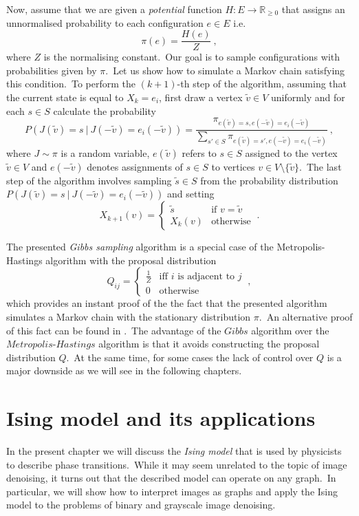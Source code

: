 \documentclass[shortabstract, english, lic]{iithesis}
\newcommand\numberedchapter[1]{\setlength\topskip{3cm}\chapter{#1}\setlength\topskip{0cm}}
\theoremstyle{default_theorem_style}\newtheorem{theorem}{Theorem}
\theoremstyle{default_theorem_style}\newtheorem{definition}{Definition}
\begin{document}
\noindent Now, assume that we are given a \textit{potential} function $H : E \to \mathbb R_{\geq 0}$ that assigns an
unnormalised probability to each configuration $e \in E$ i.e.\
$$
\pi(e) = \frac{H(e)}{Z}\ ,
$$
where $Z$ is the normalising constant.\ Our goal is to sample configurations with probabilities given by $\pi$.\ Let
us show how to simulate a Markov chain satisfying this condition.\ To
perform the $(k + 1)$-th step of the algorithm, assuming that the current state is equal to
$X_k = e_i$, first draw a vertex $\tilde{v} \in V$ uniformly and for each $s \in S$ calculate the probability
$$
P(J(\tilde{v}) = s\ |\ J(-\tilde{v})=e_i(-\tilde{v})) = \frac{\pi_{e(\tilde{v}) =
s,e(-\tilde{v}) = e_i(-\tilde{v})}}{\sum_{s' \in S} \pi_{e(\tilde{v}) = s', e(-\tilde{v}) = e_i(-\tilde{v})}}\ ,
$$
where $J \sim \pi$ is a random variable, $e(\tilde{v})$ refers to $s \in S$ assigned to the vertex $\tilde{v} \in V$
and $e(-\tilde{v})$ denotes assignments of $s \in S$ to vertices $v \in V \setminus \{\tilde{v}\}$.\ The last step of
the algorithm involves sampling $\tilde{s} \in S$ from the probability distribution
$P(J(\tilde{v}) = s\ |\ J(-\tilde{v})=e_i(-\tilde{v}))$ and setting
$$
X_{k + 1}(v) =
\begin{cases}
  \tilde{s} &\text{if $v = \tilde{v}$}\\
  X_k(v) &\text{otherwise}
\end{cases}\ .
$$

\noindent The presented \textit{Gibbs sampling} algorithm is a special case of the Metropolis-Hastings algorithm
with the proposal distribution
$$
Q_{ij} =
\begin{cases}
  \frac{1}{Z} &\text{iff $i$ is adjacent to $j$}\\
  0 &\text{otherwise}
\end{cases}\ ,
$$
which provides an instant proof of the the fact that the presented algorithm simulates a Markov chain with the
stationary distribution $\pi$.\ An alternative proof of this fact can be found in \cite{mcmc_book}.\ The advantage of
the $Gibbs$ algorithm over the $Metropolis$-$Hastings$ algorithm is that it avoids constructing  the proposal
distribution $Q$.\ At the same time, for some cases the lack of control over $Q$ is a major downside as we will see
in the following chapters.

\numberedchapter{Ising model and its applications}\label{chapter:ising_model}

\noindent In the present chapter we will discuss the \textit{Ising model} that is used by physicists to describe phase
transitions.\ While it may seem unrelated to the topic of image denoising, it turns out that the described model
can operate on any graph.\ In particular, we will show how to interpret images as graphs and apply the Ising model to
the problems of binary and grayscale image denoising.
\end{document}
